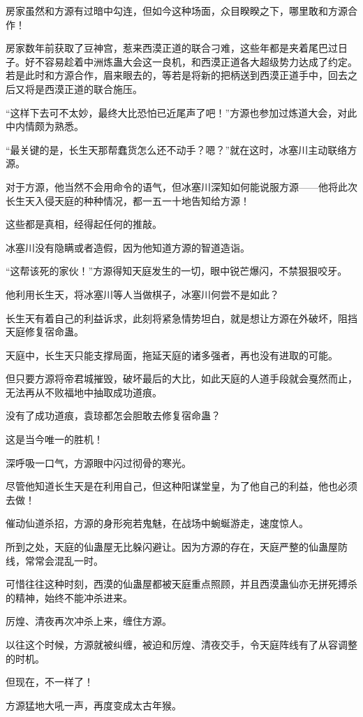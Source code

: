 \begin{this_body}
房家虽然和方源有过暗中勾连，但如今这种场面，众目睽睽之下，哪里敢和方源合作！

房家数年前获取了豆神宫，惹来西漠正道的联合刁难，这些年都是夹着尾巴过日子。好不容易趁着中洲炼蛊大会这一良机，和西漠正道各大超级势力达成了约定。若是此时和方源合作，眉来眼去的，等若是将新的把柄送到西漠正道手中，回去之后又将是西漠正道的联合施压。

“这样下去可不太妙，最终大比恐怕已近尾声了吧！”方源也参加过炼道大会，对此中内情颇为熟悉。

“最关键的是，长生天那帮蠢货怎么还不动手？嗯？”就在这时，冰塞川主动联络方源。

对于方源，他当然不会用命令的语气，但冰塞川深知如何能说服方源——他将此次长生天入侵天庭的种种情况，都一五一十地告知给方源！

这些都是真相，经得起任何的推敲。

冰塞川没有隐瞒或者造假，因为他知道方源的智道造诣。

“这帮该死的家伙！”方源得知天庭发生的一切，眼中锐芒爆闪，不禁狠狠咬牙。

他利用长生天，将冰塞川等人当做棋子，冰塞川何尝不是如此？

长生天有着自己的利益诉求，此刻将紧急情势坦白，就是想让方源在外破坏，阻挡天庭修复宿命蛊。

天庭中，长生天只能支撑局面，拖延天庭的诸多强者，再也没有进取的可能。

但只要方源将帝君城摧毁，破坏最后的大比，如此天庭的人道手段就会戛然而止，无法再从不败福地中抽取成功道痕。

没有了成功道痕，袁琼都怎会胆敢去修复宿命蛊？

这是当今唯一的胜机！

深呼吸一口气，方源眼中闪过彻骨的寒光。

尽管他知道长生天是在利用自己，但这种阳谋堂皇，为了他自己的利益，他也必须去做！

催动仙道杀招，方源的身形宛若鬼魅，在战场中蜿蜒游走，速度惊人。

所到之处，天庭的仙蛊屋无比躲闪避让。因为方源的存在，天庭严整的仙蛊屋防线，常常会混乱一时。

可惜往往这种时刻，西漠的仙蛊屋都被天庭重点照顾，并且西漠蛊仙亦无拼死搏杀的精神，始终不能冲杀进来。

厉煌、清夜再次冲杀上来，缠住方源。

以往这个时候，方源就被纠缠，被迫和厉煌、清夜交手，令天庭阵线有了从容调整的时机。

但现在，不一样了！

方源猛地大吼一声，再度变成太古年猴。


\end{this_body}
